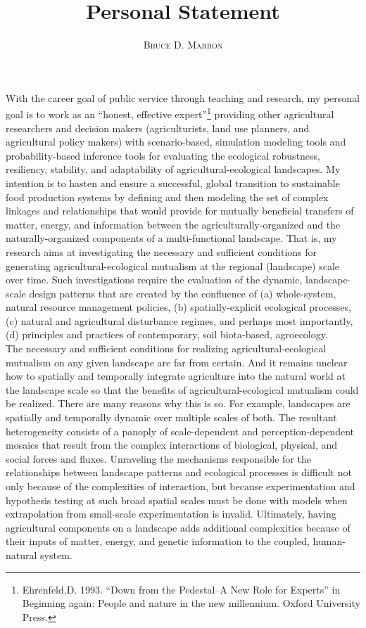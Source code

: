 \documentclass[10pt]{article}	%
\title{\vspace{-15mm}\fontsize{14pt}{10pt}\selectfont\textbf{Personal Statement}} %
\author{
\large
\textsc{Bruce D. Marron} \\ %
\vspace{-5mm}
}
\date{}
\begin{document}
\maketitle                %
\thispagestyle{fancy}     %

With the career goal of public service through teaching and research, my personal goal is to work as an \enquote{honest, effective expert}\footnote{Ehrenfeld,D. 1993. \enquote{Down from the Pedestal--A New Role for Experts} in Beginning again: People and nature in the new millennium. Oxford University Press.}  providing other agricultural researchers and decision makers (agriculturists, land use planners, and agricultural policy makers) with scenario-based, simulation modeling tools and probability-based inference tools for evaluating the ecological robustness, resiliency, stability, and adaptability of agricultural-ecological landscapes. My intention is to hasten and ensure a successful, global transition to sustainable food production systems by defining and then modeling the set of complex linkages and relationships that would provide for mutually beneficial transfers of matter, energy, and information between the agriculturally-organized and the naturally-organized components of a multi-functional landscape. That is, my research aims at investigating the necessary and sufficient conditions for generating agricultural-ecological mutualism at the regional (landscape) scale over time. Such investigations require the evaluation of the dynamic, landscape-scale design patterns that are created by the confluence of (a) whole-system, natural resource management policies, (b) spatially-explicit ecological processes, (c) natural and agricultural disturbance regimes, and perhaps most importantly, (d) principles and practices of contemporary, soil biota-based, agroecology.\\

The necessary and sufficient conditions for realizing agricultural-ecological mutualism on any given landscape are far from certain. And it remains unclear how to spatially and temporally integrate agriculture into the natural world at the landscape scale so that the benefits of agricultural-ecological mutualism could be realized. There are many reasons why this is so. For example, landscapes are spatially and temporally dynamic over multiple scales of both. The resultant heterogeneity consists of a panoply of scale-dependent and perception-dependent mosaics that result from the complex interactions of biological, physical, and social forces and fluxes. Unraveling the mechanisms responsible for the relationships between landscape patterns and ecological processes is difficult not only because of the complexities of interaction, but because experimentation and hypothesis testing at such broad spatial scales must be done with models when extrapolation from small-scale experimentation is invalid. Ultimately, having agricultural components on a landscape adds additional complexities because of their inputs of matter, energy, and genetic information to the coupled, human-natural system. \\
\end{document}
